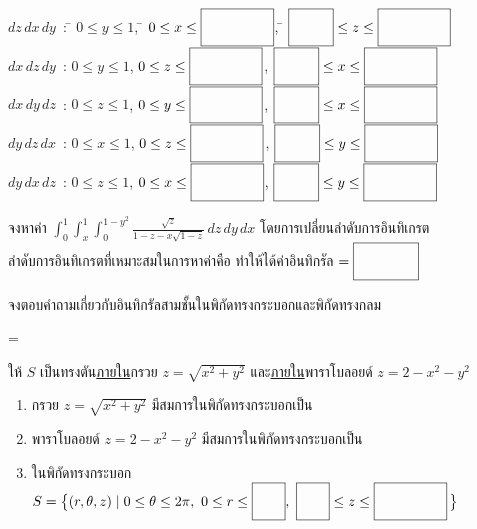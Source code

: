 \documentclass[12pt,final]{novelette} %
\begin{document}
\begin{question}
\begin{question}
        \medskip
        \def\tb#1{$\ansboxi{0.9cm} \leq #1 \leq \ansboxi{1.6cm}$}
        \begin{tabbing}
            $dz \, dx \, dy$\ : \quad \= $0 \leq y \leq 1$, \quad \= $0 \leq x \leq \ansboxi{1.6cm}$, \quad \= \tb{z} \\[0.8em]
            $dx \, dz \, dy$\ : \quad \> $0 \leq y \leq 1$, \quad \> $0 \leq z \leq \ansboxi{1.6cm}$, \quad \> \tb{x} \\[0.8em]
            $dx \, dy \, dz$\ : \quad \> $0 \leq z \leq 1$, \quad \> $0 \leq y \leq \ansboxi{1.6cm}$, \quad \> \tb{x} \\[0.8em]
            $dy \, dz \, dx$\ : \quad \> $0 \leq x \leq 1$, \quad \> $0 \leq z \leq \ansboxi{1.6cm}$, \quad \> \tb{y} \\[0.8em]
            $dy \, dx \, dz$\ : \quad \> $0 \leq z \leq 1$, \quad \> $0 \leq x \leq \ansboxi{1.6cm}$, \quad \> \tb{y}
        \end{tabbing}

        \vspace{2.5em}

        \item จงหาค่า $\displaystyle\int_0^1\int_x^1\int_0^{1-y^2} \frac {\sqrt{z}} {1 - z - x\sqrt{1 - z}} \, dz \, dy \, dx$ โดยการเปลี่ยนลำดับการอินทิเกรต \\[2em]
        ลำดับการอินทิเกรตที่เหมาะสมในการหาค่าคือ \ansboxi{2.3cm} \quad ทำให้ได้ค่าอินทิกรัล $= \ansboxs$
    \end{question}

    \pagebreak

    \item {} %
     จงตอบคำถามเกี่ยวกับอินทิกรัลสามชั้นในพิกัดทรงกระบอกและพิกัดทรงกลม

    \medskip
    \begin{question}
        \everymath={\displaystyle}
        \item ให้ $S$ เป็นทรงตัน\uline{ภายใน}กรวย $z = \sqrt{x^2 + y^2}$ และ\uline{ภายใน}พาราโบลอยด์ $z = 2 - x^2 - y^2$
        \begin{enumerate}[label=(\alph*),itemsep=16pt,topsep=5pt]
            \item กรวย $z = \sqrt{x^2 + y^2}$ มีสมการในพิกัดทรงกระบอกเป็น \ansboxl

            \item พาราโบลอยด์ $z = 2 - x^2 - y^2$ มีสมการในพิกัดทรงกระบอกเป็น \ansboxl

            \item ในพิกัดทรงกระบอก \mbox{$S = \bigl\{(r, \theta, z) \mid 0 \leq \theta \leq 2\pi,\ 0 \leq r \leq \ansboxi{0.6cm},\ \ansboxi{0.6cm} \leq z \leq \ansboxi{1.6cm}\,\bigr\}$}


\end{enumerate}
\end{question}
\end{question}
\end{document}
